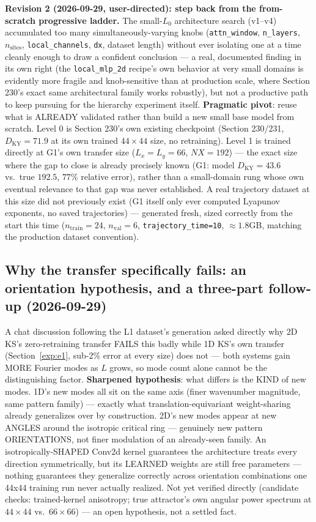 \documentclass[11pt]{article}
\begin{document}
\textbf{Revision 2 (2026-09-29, user-directed): step back from the
from-scratch progressive ladder.} The small-$L_0$ architecture search
(v1--v4) accumulated too many simultaneously-varying knobs
(\texttt{attn\_window}, \texttt{n\_layers}, $n_{\mathrm{sites}}$,
\texttt{local\_channels}, \texttt{dx}, dataset length) without ever
isolating one at a time cleanly enough to draw a confident conclusion
--- a real, documented finding in its own right (the \texttt{local\_mlp\_2d}
recipe's own behavior at very small domains is evidently more fragile
and knob-sensitive than at production scale, where Section 230's exact
same architectural family works robustly), but not a productive path to
keep pursuing for the hierarchy experiment itself. \textbf{Pragmatic
pivot}: reuse what is ALREADY validated rather than build a new small
base model from scratch. Level 0 is Section 230's own existing
checkpoint (Section 230/231, $D_{\mathrm{KY}}=71.9$ at its own trained
$44\times44$ size, no retraining). Level 1 is trained directly at G1's
own transfer size ($L_x{=}L_y{=}66$, $NX{=}192$) --- the exact size
where the gap to close is already precisely known (G1: model
$D_{\mathrm{KY}}=43.6$ vs.\ true $192.5$, $77\%$ relative error), rather
than a small-domain rung whose own eventual relevance to that gap was
never established. A real trajectory dataset at this size did not
previously exist (G1 itself only ever computed Lyapunov exponents, no
saved trajectories) --- generated fresh, sized correctly from the start
this time ($n_{\mathrm{train}}{=}24$, $n_{\mathrm{val}}{=}6$,
\texttt{trajectory\_time=10}, $\approx1.8$GB, matching the production
dataset convention).

\subsection{Why the transfer specifically fails: an orientation hypothesis, and a three-part follow-up (2026-09-29)}
\label{sec:orientation_hypothesis}

A chat discussion following the L1 dataset's generation asked directly
why 2D KS's zero-retraining transfer FAILS this badly while 1D KS's own
transfer (Section~\ref{exp:e1}, sub-2\% error at every size) does not
--- both systems gain MORE Fourier modes as $L$ grows, so mode count
alone cannot be the distinguishing factor. \textbf{Sharpened hypothesis}:
what differs is the KIND of new modes. 1D's new modes all sit on the
same axis (finer wavenumber magnitude, same pattern family) --- exactly
what translation-equivariant weight-sharing already generalizes over by
construction. 2D's new modes appear at new ANGLES around the isotropic
critical ring --- genuinely new pattern ORIENTATIONS, not finer
modulation of an already-seen family. An isotropically-SHAPED Conv2d
kernel guarantees the architecture treats every direction symmetrically,
but its LEARNED weights are still free parameters --- nothing guarantees
they generalize correctly across orientation combinations one 44x44
training run never actually realized. Not yet verified directly
(candidate checks: trained-kernel anisotropy; true attractor's own
angular power spectrum at $44\times44$ vs.\ $66\times66$) --- an open
hypothesis, not a settled fact.
\end{document}
